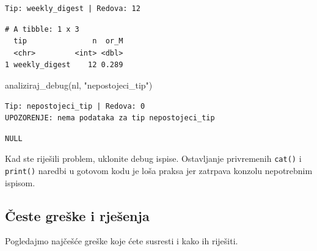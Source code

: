 \documentclass[
  croatian,
  letterpaper,
  DIV=11,
  numbers=noendperiod]{scrartcl}
\newenvironment{Shaded}{\begin{snugshade}}{\end{snugshade}}
\newcommand{\FunctionTok}[1]{\textcolor[rgb]{0.28,0.35,0.67}{#1}}
\newcommand{\NormalTok}[1]{\textcolor[rgb]{0.00,0.23,0.31}{#1}}
\newcommand{\StringTok}[1]{\textcolor[rgb]{0.13,0.47,0.30}{#1}}
\begin{document}
\begin{verbatim}
Tip: weekly_digest | Redova: 12 
\end{verbatim}

\begin{verbatim}
# A tibble: 1 x 3
  tip               n  or_M
  <chr>         <int> <dbl>
1 weekly_digest    12 0.289
\end{verbatim}

\begin{Shaded}
\begin{Highlighting}[]
\FunctionTok{analiziraj\_debug}\NormalTok{(nl, }\StringTok{"nepostojeci\_tip"}\NormalTok{)}
\end{Highlighting}
\end{Shaded}

\begin{verbatim}
Tip: nepostojeci_tip | Redova: 0 
UPOZORENJE: nema podataka za tip nepostojeci_tip 
\end{verbatim}

\begin{verbatim}
NULL
\end{verbatim}

Kad ste riješili problem, uklonite debug ispise. Ostavljanje privremenih
\texttt{cat()} i \texttt{print()} naredbi u gotovom kodu je loša praksa
jer zatrpava konzolu nepotrebnim ispisom.

\subsection{Česte greške i
rješenja}\label{ux10deste-greux161ke-i-rjeux161enja}

Pogledajmo najčešće greške koje ćete susresti i kako ih riješiti.
\end{document}
